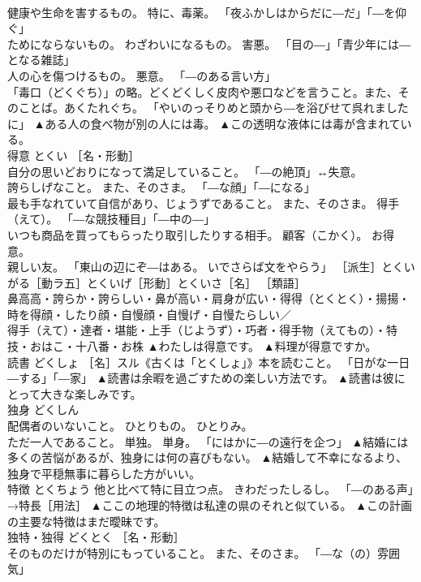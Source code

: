 \documentclass[8pt]{extreport}
\begin{document}
\begin{CJK}{UTF8}{min}
\\	健康や生命を害するもの。 特に、毒薬。 「夜ふかしはからだに―だ」「―を仰ぐ」 
\\	ためにならないもの。 わざわいになるもの。 害悪。 「目の―」「青少年には―となる雑誌」 
\\	人の心を傷つけるもの。 悪意。 「―のある言い方」 
\\	「毒口（どくぐち）」の略。どくどくしく皮肉や悪口などを言うこと。また、そのことば。あくたれぐち。 「やいのっそりめと頭から―を浴びせて呉れましたに」	▲ある人の食べ物が別の人には毒。 ▲この透明な液体には毒が含まれている。
\\	得意	とくい	［名・形動］ 
\\	自分の思いどおりになって満足していること。 「―の絶頂」↔失意。 
\\	誇らしげなこと。 また、そのさま。 「―な顔」「―になる」 
\\	最も手なれていて自信があり、じょうずであること。 また、そのさま。 得手（えて）。 「―な競技種目」「―中の―」 
\\	いつも商品を買ってもらったり取引したりする相手。 顧客（こかく）。 お得意。 
\\	親しい友。 「東山の辺にぞ―はある。 いでさらば文をやらう」 ［派生］とくいがる［動ラ五］とくいげ［形動］とくいさ［名］ ［類語］
\\	鼻高高・誇らか・誇らしい・鼻が高い・肩身が広い・得得（とくとく）・揚揚・時を得顔・したり顔・自慢顔・自慢げ・自慢たらしい／
\\	得手（えて）・達者・堪能・上手（じようず）・巧者・得手物（えてもの）・特技・おはこ・十八番・お株	▲わたしは得意です。 ▲料理が得意ですか。
\\	読書	どくしょ	［名］スル《古くは「とくしょ」》本を読むこと。 「日がな一日―する」「―家」	▲読書は余暇を過ごすための楽しい方法です。 ▲読書は彼にとって大きな楽しみです。
\\	独身	どくしん	
\\	配偶者のいないこと。 ひとりもの。 ひとりみ。 
\\	ただ一人であること。 単独。 単身。 「にはかに―の遠行を企つ」	▲結婚には多くの苦悩があるが、独身には何の喜びもない。 ▲結婚して不幸になるより、独身で平穏無事に暮らした方がいい。
\\	特徴	とくちょう	他と比べて特に目立つ点。 きわだったしるし。 「―のある声」→特長［用法］	▲ここの地理的特徴は私達の県のそれと似ている。 ▲この計画の主要な特徴はまだ曖昧です。
\\	独特・独得	どくとく	［名・形動］ 
\\	そのものだけが特別にもっていること。 また、そのさま。 「―な（の）雰囲気」 

\end{CJK}
\end{document}
